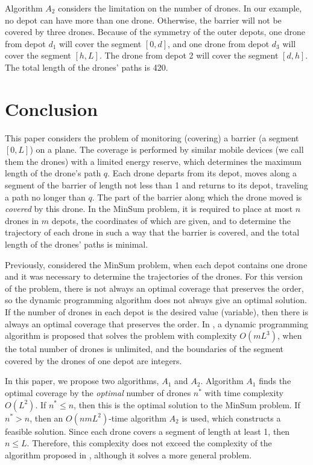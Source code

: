 \documentclass[runningheads]{llncs}
\begin{document}
Algorithm $A_2$ considers the limitation on the number of drones. In our example, no depot can have more than one drone. Otherwise, the barrier will not be covered by three drones. Because of the symmetry of the outer depots, one drone from depot $d_1$ will cover the segment $[0,d]$, and one drone from depot $d_3$ will cover the segment $[h,L]$. The drone from depot 2 will cover the segment $[d,h]$. The total length of the drones’ paths is 420.


\section{Conclusion}
This paper considers the problem of monitoring (covering) a barrier (a segment $[0,L]$) on a plane. The coverage is performed by similar mobile devices (we call them the drones) with a limited energy reserve, which determines the maximum length of the drone’s path $q$. Each drone departs from its depot, moves along a segment of the barrier of length not less than 1 and returns to its depot, traveling a path no longer than $q$. The part of the barrier along which the drone moved is \emph{covered} by this drone. In the MinSum problem, it is required to place at most $n$ drones in $m$ depots, the coordinates of which are given, and to determine the trajectory of each drone in such a way that the barrier is covered, and the total length of the drones’ paths is minimal.

Previously, \cite{ErPlot20} considered the MinSum problem, when each depot contains one drone and it was necessary to determine the trajectories of the drones. For this version of the problem, there is not always an optimal coverage that preserves the order, so the dynamic programming algorithm does not always give an optimal solution. If the number of drones in each depot is the desired value (variable), then there is always an optimal coverage that preserves the order. In \cite{ErShad24}, a dynamic programming algorithm is proposed that solves the problem with complexity $O(mL^3)$, when the total number of drones is unlimited, and the boundaries of the segment covered by the drones of one depot are integers.

In this paper, we propose two algorithms, $A_1$ and $A_2$. Algorithm $A_1$ finds the optimal coverage by the \emph{optimal} number of drones $n^*$ with time complexity $O(L^2)$. If $n^*\leq n$, then this is the optimal solution to the MinSum problem. If $n^* > n$, then an $O(nmL^2)$-time algorithm $A_2$ is used, which constructs a feasible solution. Since each drone covers a segment of length at least 1, then $n\leq L$. Therefore, this complexity does not exceed the complexity of the algorithm proposed in \cite{ErShad24}, although it solves a more general problem.
\end{document}
